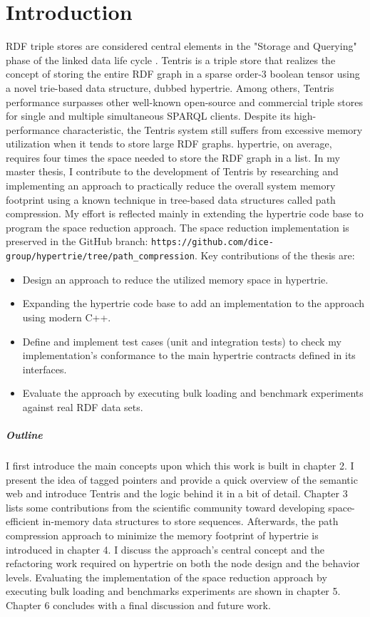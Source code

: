 \chapter{Introduction}
\label{ch:introduction}
RDF triple stores are considered central elements in the "Storage and Querying" phase of the linked data life cycle \cite{axel}.
Tentris is a triple store that realizes the concept of storing the entire RDF graph in a sparse order-3 boolean tensor using a novel trie-based data structure, dubbed hypertrie.
Among others, Tentris performance surpasses other well-known open-source and commercial triple stores \cite{tentris2020} for single and multiple simultaneous SPARQL clients. Despite its high-performance characteristic, the Tentris system still suffers from excessive memory utilization when it tends to store large RDF graphs. hypertrie, on average, requires four times the space needed to store the RDF graph in a list. In my master thesis, I contribute to the development of Tentris by researching and implementing an approach to practically reduce the overall system memory footprint using a known technique in tree-based data structures called path compression. My effort is reflected mainly in extending the hypertrie code base to program the space reduction approach. The space reduction implementation is preserved in the GitHub branch: \verb|https://github.com/dice-group/hypertrie/tree/path_compression|. Key contributions of the thesis are:
\begin{itemize}
	\item Design an approach to reduce the utilized memory space in hypertrie.
	\item Expanding the hypertrie code base to add an implementation to the approach using modern C++.
	\item Define and implement test cases (unit and integration tests) to check my implementation's conformance to the main hypertrie contracts defined in its interfaces.
	\item Evaluate the approach by executing bulk loading and benchmark experiments against real RDF data sets.
\end{itemize}


\paragraph{Outline} I first introduce the main concepts upon which this work is built in chapter 2. I present the idea of tagged pointers and provide a quick overview of the semantic web and introduce Tentris and the logic behind it in a bit of detail. Chapter 3 lists some contributions from the scientific community toward developing space-efficient in-memory data structures to store sequences. Afterwards, the path compression approach to minimize the memory footprint of hypertrie is introduced in chapter 4. I discuss the approach's central concept and the refactoring work required on hypertrie on both the node design and the behavior levels. Evaluating the implementation of the space reduction approach by executing bulk loading and benchmarks experiments are shown in chapter 5. Chapter 6 concludes with a final discussion and future work. 